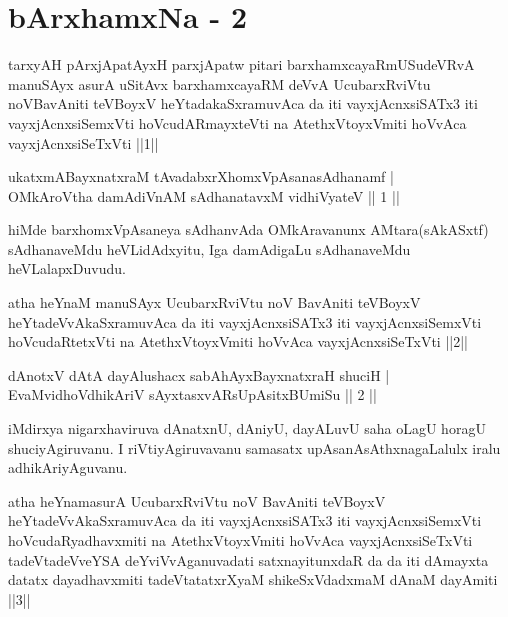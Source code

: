 
\chapter{bArxhamxNa - 2}
\begin{kandikeshl}
tarxyAH pArxjApatAyxH parxjApatw pitari barxhamxcayaRmUSudeVRvA manuSAyx asurA uSitAvx barxhamxcayaRM deVvA UcubarxRviVtu noV\break BavAniti teVBoyxV heYtadakaSxramuvAca da iti vayxjAcnxsiSATx3 iti vayxjAcnxsiSemxVti hoVcudARmayxteVti na AtethxVtoyxVmiti hoVvAca vayxjAcnxsiSeTxVti ||1||
\end{kandikeshl}

\begin{shl}
ukatxmABayxnatxraM tAvadabxrXhomxVpAsanasAdhanamf | \\
OMkAroV\s tha damAdiVnAM sAdhanatavxM vidhiVyateV \hfill||  1 || 
\end{shl}

\begin{artha}
hiMde barxhomxVpAsaneya sAdhanvAda OMkAravanunx AMtara\break (sAkASxtf) sAdhanaveMdu heVLidAdxyitu, Iga damAdigaLu sAdhanaveMdu heVLalapxDuvudu. 
\end{artha}

\begin{kandikeshl}
atha heYnaM manuSAyx UcubarxRviVtu noV BavAniti teVBoyxV heYtadeVvAkaSxramuvAca da iti vayxjAcnxsiSATx3 iti vayxjAcnxsiSemxVti hoVcudaRtetxVti na AtethxVtoyxVmiti hoVvAca vayxjAcnxsiSeTxVti ||2||
\end{kandikeshl}


\begin{shl}
dAnotxV dAtA dayAlushacx sabAhAyxBayxnatxraH shuciH | \\
EvaMvidhoV\s dhikAriV sAyxtasxvARsUpAsitxBUmiSu \hfill||  2 ||
\end{shl}

\begin{artha}
iMdirxya nigarxhaviruva dAnatxnU, dAniyU, dayALuvU saha oLagU  horagU shuciyAgiruvanu. I riVtiyAgiruvavanu samasatx upAsanAsAthxnagaLalulx iralu adhikAriyAguvanu.
\end{artha}

\begin{kandikeshl}
atha heYnamasurA UcubarxRviVtu noV BavAniti teVBoyxV heYtadeVvAkaSxramuvAca da iti vayxjAcnxsiSATx3 iti vayxjAcnxsiSemxVti hoVcudaRya\-dhavxmiti na AtethxVtoyxVmiti hoVvAca vayxjAcnxsiSeTxVti tadeVtadeVveYSA deYviV\break vAganuvadati satxnayitunxdaR da da iti dAmayxta datatx dayadhavxmiti tadeVtatatxrXyaM shikeSxVdadxmaM dAnaM dayAmiti ||3||
\end{kandikeshl}

